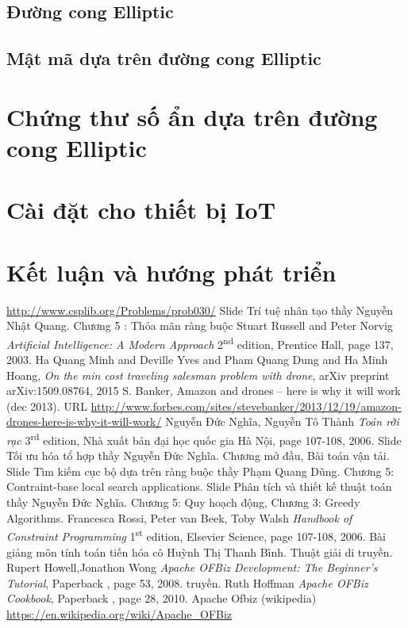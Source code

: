 \documentclass[a4paper,12pt]{report}
\begin{document}
\section{Đường cong Elliptic}
\section{Mật mã dựa trên đường cong Elliptic}
\chapter{Chứng thư số ẩn dựa trên đường cong Elliptic}
\chapter{Cài đặt cho thiết bị IoT}
\chapter*{Kết luận và hướng phát triển}
\begin{thebibliography}{9}
 \url{http://www.csplib.org/Problems/prob030/}
 Slide Trí tuệ nhân tạo thầy Nguyễn Nhật Quang. Chương 5 : Thỏa mãn ràng buộc
 Stuart Russell and Peter Norvig 
\textit{Artificial Intelligence: A Modern Approach} 2\textsuperscript{nd } edition, Prentice Hall, page 137,  2003.
 Ha Quang Minh and Deville Yves and Pham Quang Dung and Ha Minh Hoang, \textit{On the min cost traveling salesman problem with drone}, arXiv preprint arXiv:1509.08764, 2015
 S. Banker, Amazon and drones – here is why it will work (dec 2013).
URL \url{http://www.forbes.com/sites/stevebanker/2013/12/19/amazon-drones-here-is-why-it-will-work/}
 Nguyễn Đức Nghĩa, Nguyễn Tô Thành 
\textit{Toán rời rạc} 3\textsuperscript{rd} edition, Nhà xuất bản đại học quốc gia Hà Nội, page 107-108,  2006.
 Slide Tối ưu hóa tổ hợp thầy Nguyễn Đức Nghĩa. Chương mở đầu, Bài toán vận tải.
 Slide Tìm kiếm cục bộ dựa trên ràng buộc thầy Phạm Quang Dũng. Chương 5: Contraint-base local search applications.
 Slide Phân tích và thiết kế thuật toán thầy Nguyễn Đức Nghĩa. Chương 5: Quy hoạch động, Chương 3: Greedy Algorithms.
 Francesca Rossi, Peter van Beek, Toby Walsh 
\textit{Handbook of Constraint Programming} 1\textsuperscript{st} edition, Elsevier Science, page 107-108,  2006.
 Bài giảng môn tính toán tiến hóa cô Huỳnh Thị Thanh Bình. Thuật giải di truyền.
Rupert Howell,Jonathon Wong
\textit{Apache OFBiz Development: The Beginner's Tutorial}, Paperback , page 53,  2008.
truyền.
 Ruth Hoffman
\textit{Apache OFBiz Cookbook}, Paperback , page 28, 2010.
 Apache Ofbiz (wikipedia)
\url{https://en.wikipedia.org/wiki/Apache_OFBiz}
\end{thebibliography}
\end{document}
